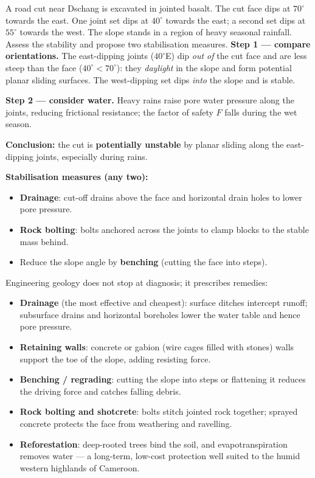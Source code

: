 \documentclass[11pt]{article}
\newcounter{popsec}
\newcounter{popsub}
\newcommand{\courssub}[1]{%
  \stepcounter{popsub}%
  \par\vspace{9pt}\noindent{\popxbold\fontsize{11.5}{13}\selectfont\color{popink}{\color{poporange}\thepopsec.\thepopsub}\hspace{6pt}#1}\par\nopagebreak\vspace{4pt}
}
\begin{document}
\begin{exoresolu}
A road cut near Dschang is excavated in jointed basalt. The cut face dips at $70^{\circ}$ towards the east. One joint set dips at $40^{\circ}$ towards the east; a second set dips at $55^{\circ}$ towards the west. The slope stands in a region of heavy seasonal rainfall. Assess the stability and propose two stabilisation measures.
\tcblower
\textbf{Step 1 --- compare orientations.} The east-dipping joints ($40^{\circ}$E) dip \emph{out of} the cut face and are less steep than the face ($40^{\circ} < 70^{\circ}$): they \emph{daylight} in the slope and form potential planar sliding surfaces. The west-dipping set dips \emph{into} the slope and is stable.

\textbf{Step 2 --- consider water.} Heavy rains raise pore water pressure along the joints, reducing frictional resistance; the factor of safety $F$ falls during the wet season.

\textbf{Conclusion:} the cut is \textbf{potentially unstable} by planar sliding along the east-dipping joints, especially during rains.

\textbf{Stabilisation measures (any two):}
\begin{itemize}
\item \textbf{Drainage}: cut-off drains above the face and horizontal drain holes to lower pore pressure.
\item \textbf{Rock bolting}: bolts anchored across the joints to clamp blocks to the stable mass behind.
\item Reduce the slope angle by \textbf{benching} (cutting the face into steps).
\end{itemize}
\end{exoresolu}

\courssub{Stabilisation Measures}

Engineering geology does not stop at diagnosis; it prescribes remedies:

\begin{itemize}
\item \textbf{Drainage} (the most effective and cheapest): surface ditches intercept runoff; subsurface drains and horizontal boreholes lower the water table and hence pore pressure.
\item \textbf{Retaining walls}: concrete or gabion (wire cages filled with stones) walls support the toe of the slope, adding resisting force.
\item \textbf{Benching / regrading}: cutting the slope into steps or flattening it reduces the driving force and catches falling debris.
\item \textbf{Rock bolting and shotcrete}: bolts stitch jointed rock together; sprayed concrete protects the face from weathering and ravelling.
\item \textbf{Reforestation}: deep-rooted trees bind the soil, and evapotranspiration removes water --- a long-term, low-cost protection well suited to the humid western highlands of Cameroon.
\end{itemize}
\end{document}
